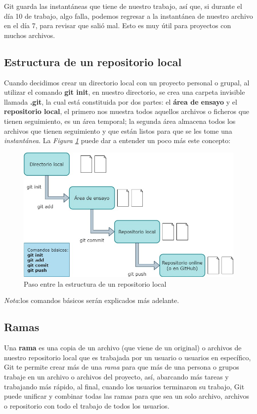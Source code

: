 Git guarda las instantáneas que tiene de nuestro trabajo, así que, si durante el día 10 de trabajo, algo falla, podemos regresar a la instantánea de nuestro archivo en el día 7, para revisar que salió mal. Esto es muy útil para proyectos con muchos archivos.


\subsection{Estructura de un repositorio local}

Cuando decidimos crear un directorio local con un proyecto personal o grupal, al utilizar el comando \textbf{git init}, en nuestro directorio, se crea una carpeta invisible llamada\textbf{ .git}, la cual está constituida por dos partes: el \textbf{área de ensayo} y el \textbf{repositorio local}, el primero nos muestra todos aquellos archivos o ficheros que tienen seguimiento, es un área temporal; la segunda área almacena todos los archivos que tienen seguimiento y que están listos para que se les tome una \textit{instantánea}. La \textit{Figura \ref{fig: 2}} puede dar a entender un poco más este concepto:
\begin{figure}[H]
    \centering
    \caption{Paso entre la estructura de un repositorio local}
    \label{fig: 2}
    \includegraphics[width=\textwidth]{conceptos/g2.jpg}
\end{figure}

\textit{Nota}:los comandos básicos serán explicados más adelante.


\subsection{Ramas}

Una \textbf{rama} es una copia de un archivo (que viene de un original) o archivos de nuestro repositorio local que es trabajada por un usuario o usuarios en específico, Git te permite crear más de una \textit{rama} para que más de una persona o grupos trabaje en un archivo o archivos del proyecto, así, abarcando más tareas y trabajando más rápido, al final, cuando los usuarios terminaron su trabajo, Git puede unificar y combinar todas las ramas para que sea un solo archivo, archivos o repositorio con todo el trabajo de todos los usuarios.

